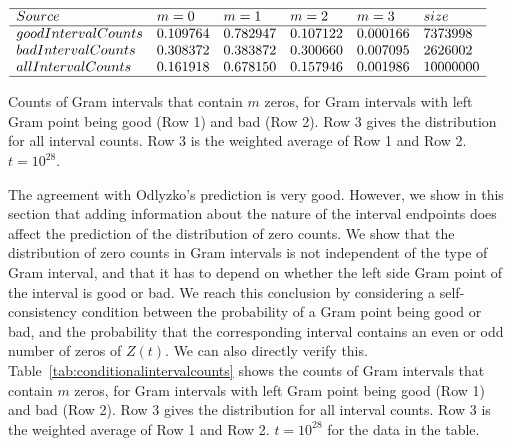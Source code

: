 \documentclass[twoside]{article}
\theoremstyle{definition}
\begin{document}
\begin{table}
\centering \(\begin{array}{llllll}
\hline
Source &m = 0&m = 1&m = 2&m = 3&size\\
\hline
goodIntervalCounts &0.109764 &0.782947 &0.107122 &0.000166 &7373998  \\
badIntervalCounts &0.308372 &0.383872 &0.300660 &0.007095 &2626002  \\
allIntervalCounts&0.161918&0.678150&0.157946&0.001986&10000000\\
\hline
\end{array}\)
\caption{Counts of Gram intervals that contain $m$ zeros, for Gram intervals with left Gram point being good (Row 1) and bad (Row 2). Row 3 gives
the distribution for all interval counts. Row 3 is the weighted average of Row 1 and Row 2.  $t=10^{28}$.} 
\label{tab:conditionalintervalcounts}
\end{table}
The agreement with Odlyzko's prediction is very good. However, we show in this section that adding information about the nature of the interval endpoints does affect the prediction of the
distribution of zero counts. We show that the distribution of zero counts in Gram intervals is not independent of the type of Gram interval, and that it has to depend on whether the left side Gram point of the interval is good or bad. We reach this conclusion by considering a self-consistency condition between the probability of a Gram point being good or bad, and the probability that the corresponding interval contains an even or odd number of zeros of $Z(t)$.  We can also directly verify this. Table~\ref{tab:conditionalintervalcounts} shows the counts of Gram intervals that contain $m$ zeros, for Gram intervals with left Gram point being good (Row 1) and bad (Row 2). Row 3 gives
the distribution for all interval counts. Row 3 is the weighted average of Row 1 and Row 2. $t=10^{28}$ for the data in the table.
\end{document}
